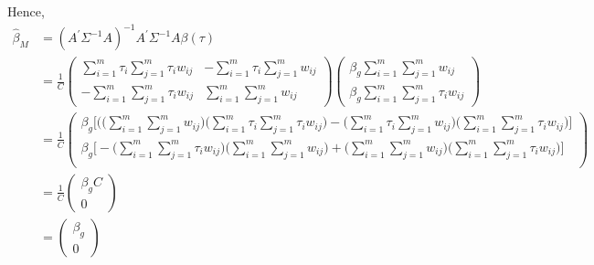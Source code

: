 \documentclass[12pt]{article}
\begin{document}
\begin{appendices}
Hence,
\begin{equation}
\begin{split}
\widehat{\beta}_M &= (A^{'}\Sigma^{-1}A)^{-1} A^{'}\Sigma^{-1}A \beta(\tau) \\ &= \frac{1}{C}
\begin{pmatrix}
\sum_{i=1}^{m}  \tau_i \sum_{j=1}^{m} \tau_i w_{ij} & - \sum_{i=1}^{m} \tau_i \sum_{j=1}^{m} w_{ij}\\
-\sum_{i=1}^{m} \sum_{j=1}^{m} \tau_i w_{ij} & \sum_{i=1}^{m} \sum_{j=1}^{m} w_{ij}
\end{pmatrix} 
\begin{pmatrix}
\beta_g \sum_{i=1}^{m} \sum_{j=1}^{m} w_{ij} \\ 
\beta_g \sum_{i=1}^{m} \sum_{j=1}^{m} \tau_i w_{ij} 
\end{pmatrix} \\&=
\frac{1}{C} \begin{pmatrix}
\beta_g \big[\big(\big(\sum_{i=1}^{m} \sum_{j=1}^{m} w_{ij}\big) \big(\sum_{i=1}^{m}  \tau_i \sum_{j=1}^{m} \tau_i w_{ij}\big) - \big( \sum_{i=1}^{m} \tau_i \sum_{j=1}^{m} w_{ij}\big) \big(\sum_{i=1}^{m} \sum_{j=1}^{m} \tau_i w_{ij} \big)\big] \\
\beta_g \big[
- \big(\sum_{i=1}^{m} \sum_{j=1}^{m} \tau_i w_{ij} \big)
\big( \sum_{i=1}^{m} \sum_{j=1}^{m} w_{ij}\big) + 
\big( \sum_{i=1}^{m} \sum_{j=1}^{m} w_{ij}\big) 
\big(\sum_{i=1}^{m} \sum_{j=1}^{m} \tau_i w_{ij} \big) \big]  \\ \end{pmatrix} \\ &= \frac{1}{C} \begin{pmatrix} \beta_g C \\ 0  \end{pmatrix} \\ &=  \begin{pmatrix} \beta_g \\ 0  \end{pmatrix}
\end{split}
\end{equation}
\end{appendices}
\end{document}
